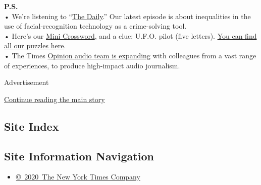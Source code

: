 \textbf{P.S.}\\
• We're listening to
``\href{https://www.nytimes3xbfgragh.onion/thedaily}{The Daily}.'' Our
latest episode is about inequalities in the use of facial-recognition
technology as a crime-solving tool.\\
• Here's our
\href{https://www.nytimes3xbfgragh.onion/crosswords/game/mini}{Mini
Crossword}, and a clue: U.F.O. pilot (five letters).
\href{https://www.nytimes3xbfgragh.onion/crosswords}{You can find all
our puzzles here}.\\
• The Times
\href{https://www.nytco.com/press/introducing-the-opinion-audio-team/}{Opinion
audio team is expanding} with colleagues from a vast range of
experiences, to produce high-impact audio journalism.

Advertisement

\protect\hyperlink{after-bottom}{Continue reading the main story}

\hypertarget{site-index}{%
\subsection{Site Index}\label{site-index}}

\hypertarget{site-information-navigation}{%
\subsection{Site Information
Navigation}\label{site-information-navigation}}

\begin{itemize}
\tightlist
\item
  \href{https://help.nytimes3xbfgragh.onion/hc/en-us/articles/115014792127-Copyright-notice}{©~2020~The
  New York Times Company}
\end{itemize}

